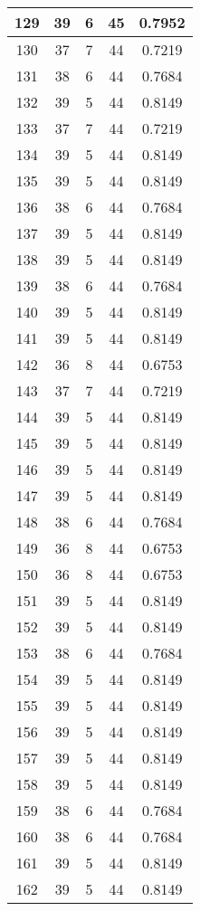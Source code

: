 \documentclass[letterpaper, 12pt]{article}
\begin{document}
\begin{longtable}{|c|c|c|c|c|}
\hline
129 & 39 & 6 & 45 & 0.7952 \\
\hline
130 & 37 & 7 & 44 & 0.7219 \\
\hline
131 & 38 & 6 & 44 & 0.7684 \\
\hline
132 & 39 & 5 & 44 & 0.8149 \\
\hline
133 & 37 & 7 & 44 & 0.7219 \\
\hline
134 & 39 & 5 & 44 & 0.8149 \\
\hline
135 & 39 & 5 & 44 & 0.8149 \\
\hline
136 & 38 & 6 & 44 & 0.7684 \\
\hline
137 & 39 & 5 & 44 & 0.8149 \\
\hline
138 & 39 & 5 & 44 & 0.8149 \\
\hline
139 & 38 & 6 & 44 & 0.7684 \\
\hline
140 & 39 & 5 & 44 & 0.8149 \\
\hline
141 & 39 & 5 & 44 & 0.8149 \\
\hline
142 & 36 & 8 & 44 & 0.6753 \\
\hline
143 & 37 & 7 & 44 & 0.7219 \\
\hline
144 & 39 & 5 & 44 & 0.8149 \\
\hline
145 & 39 & 5 & 44 & 0.8149 \\
\hline
146 & 39 & 5 & 44 & 0.8149 \\
\hline
147 & 39 & 5 & 44 & 0.8149 \\
\hline
148 & 38 & 6 & 44 & 0.7684 \\
\hline
149 & 36 & 8 & 44 & 0.6753 \\
\hline
150 & 36 & 8 & 44 & 0.6753 \\
\hline
151 & 39 & 5 & 44 & 0.8149 \\
\hline
152 & 39 & 5 & 44 & 0.8149 \\
\hline
153 & 38 & 6 & 44 & 0.7684 \\
\hline
154 & 39 & 5 & 44 & 0.8149 \\
\hline
155 & 39 & 5 & 44 & 0.8149 \\
\hline
156 & 39 & 5 & 44 & 0.8149 \\
\hline
157 & 39 & 5 & 44 & 0.8149 \\
\hline
158 & 39 & 5 & 44 & 0.8149 \\
\hline
159 & 38 & 6 & 44 & 0.7684 \\
\hline
160 & 38 & 6 & 44 & 0.7684 \\
\hline
161 & 39 & 5 & 44 & 0.8149 \\
\hline
162 & 39 & 5 & 44 & 0.8149 \\

\end{longtable}
\end{document}
